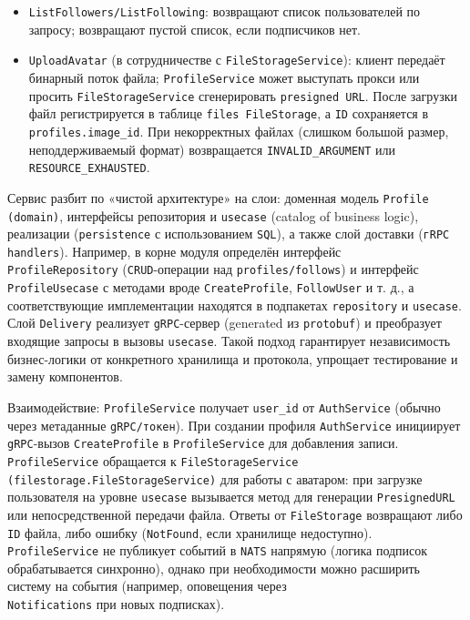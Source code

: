 \begin{itemize}
    \item \texttt{ListFollowers/ListFollowing}: возвращают список пользователей по запросу; возвращают пустой список, если подписчиков нет.
    \item \texttt{UploadAvatar} (в сотрудничестве с \texttt{FileStorageService}): клиент передаёт бинарный поток файла; \texttt{ProfileService} может выступать прокси или просить \texttt{FileStorageService} сгенерировать \texttt{presigned URL}. После загрузки файл регистрируется в таблице \texttt{files FileStorage}, а \texttt{ID} сохраняется в \texttt{profiles.image\_id}. При некорректных файлах (слишком большой размер, неподдерживаемый формат) возвращается \texttt{INVALID\_ARGUMENT} или \texttt{RESOURCE\_EXHAUSTED}.
\end{itemize}
\noindent Сервис разбит по «чистой архитектуре» на слои: доменная модель \texttt{Profile (domain)}, интерфейсы репозитория и \texttt{usecase} (catalog of business logic), реализации (\texttt{persistence} с использованием \texttt{SQL}), а также слой доставки (\texttt{гRPC handlers}). Например, в корне модуля определён интерфейс \\ \texttt{ProfileRepository} (\texttt{CRUD}-операции над \texttt{profiles/follows}) и интерфейс \texttt{ProfileUsecase} с методами вроде \texttt{CreateProfile}, \texttt{FollowUser} и т. д., а соответствующие имплементации находятся в подпакетах \texttt{repository} и \texttt{usecase}. Слой \texttt{Delivery} реализует \texttt{gRPC}-сервер (generated из \texttt{protobuf}) и преобразует входящие запросы в вызовы \texttt{usecase}. Такой подход гарантирует независимость бизнес-логики от конкретного хранилища и протокола, упрощает тестирование и замену компонентов.

Взаимодействие: \texttt{ProfileService} получает \texttt{user\_id} от \texttt{AuthService} (обычно через метаданные \texttt{gRPC/токен}). При создании профиля \texttt{AuthService} инициирует \texttt{gRPC}-вызов \texttt{CreateProfile} в \texttt{ProfileService} для добавления записи. \\ \texttt{ProfileService} обращается к \texttt{FileStorageService (filestorage.FileStorageService)} для работы с аватаром: при загрузке пользователя на уровне \texttt{usecase} вызывается метод для генерации \texttt{PresignedURL} или непосредственной передачи файла. Ответы от \texttt{FileStorage} возвращают либо \texttt{ID} файла, либо ошибку (\texttt{NotFound}, если хранилище недоступно). \texttt{ProfileService} не публикует событий в \texttt{NATS} напрямую (логика подписок обрабатывается синхронно), однако при необходимости можно расширить систему на события (например, оповещения через \\ \texttt{Notifications} при новых подписках).

